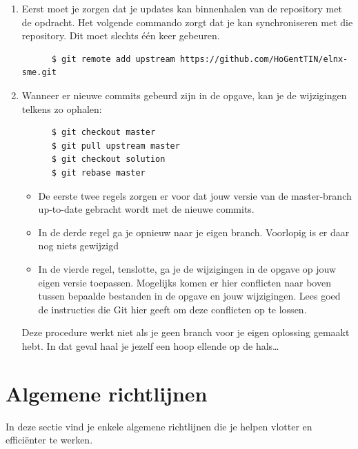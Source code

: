 \begin{enumerate}
  \item Eerst moet je zorgen dat je updates kan binnenhalen van de repository met de opdracht. Het volgende commando zorgt dat je kan synchroniseren met die repository. Dit moet slechts één keer gebeuren.

    \begin{verbatim}
      $ git remote add upstream https://github.com/HoGentTIN/elnx-sme.git
    \end{verbatim}

  \item Wanneer er nieuwe commits gebeurd zijn in de opgave, kan je de wijzigingen telkens zo ophalen:

    \begin{verbatim}
      $ git checkout master
      $ git pull upstream master
      $ git checkout solution
      $ git rebase master
    \end{verbatim}

    \begin{itemize}
      \item De eerste twee regels zorgen er voor dat jouw versie van de master-branch up-to-date gebracht wordt met de nieuwe commits.
      \item In de derde regel ga je opnieuw naar je eigen branch. Voorlopig is er daar nog niets gewijzigd
      \item In de vierde regel, tenslotte, ga je de wijzigingen in de opgave op jouw eigen versie toepassen. Mogelijks komen er hier conflicten naar boven tussen bepaalde bestanden in de opgave en jouw wijzigingen. Lees goed de instructies die Git hier geeft om deze conflicten op te lossen.
    \end{itemize}

Deze procedure werkt niet als je geen branch voor je eigen oplossing gemaakt hebt. In dat geval haal je jezelf een hoop ellende op de hals\ldots

\end{enumerate}

\section{Algemene richtlijnen}
\label{sec:algemene_richtlijnen}

In deze sectie vind je enkele algemene richtlijnen die je helpen vlotter en efficiënter te werken.

